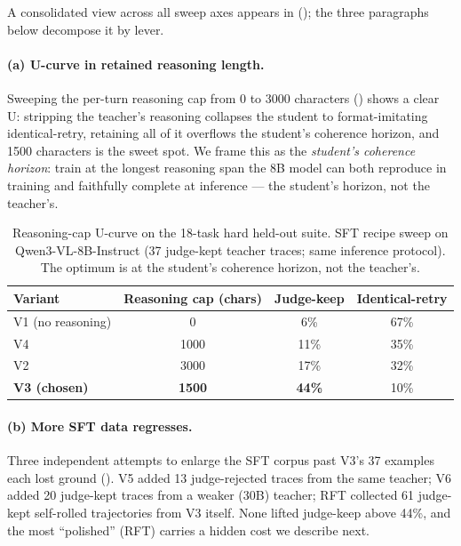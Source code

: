 \documentclass[11pt]{article}
\begin{document}
A consolidated view across all sweep axes appears in  (); the three paragraphs below decompose it by lever.

\paragraph{(a) U-curve in retained reasoning length.} Sweeping the per-turn reasoning cap from 0 to 3000 characters () shows a clear U: stripping the teacher's reasoning collapses the student to format-imitating identical-retry, retaining all of it overflows the student's coherence horizon, and 1500 characters is the sweet spot. We frame this as the \emph{student's coherence horizon}: train at the longest reasoning span the 8B model can both reproduce in training and faithfully complete at inference --- the student's horizon, not the teacher's.

\begin{table}[ht]
\centering
\caption{Reasoning-cap U-curve on the 18-task hard held-out suite. SFT recipe sweep on Qwen3-VL-8B-Instruct (37 judge-kept teacher traces; same inference protocol). The optimum is at the student's coherence horizon, not the teacher's.}
\label{tab:distill-ucurve}
\begin{tabular}{lccc}
\toprule
Variant & Reasoning cap (chars) & Judge-keep & Identical-retry \\
\midrule
V1 (no reasoning)     & 0    & 6\%  & 67\% \\
V4                    & 1000 & 11\% & 35\% \\
V2                    & 3000 & 17\% & 32\% \\
\textbf{V3 (chosen)}  & \textbf{1500} & \textbf{44\%} & 10\% \\
\bottomrule
\end{tabular}
\end{table}

\paragraph{(b) More SFT data regresses.} Three independent attempts to enlarge the SFT corpus past V3's 37 examples each lost ground (). V5 added 13 judge-rejected traces from the same teacher; V6 added 20 judge-kept traces from a weaker (30B) teacher; RFT collected 61 judge-kept self-rolled trajectories from V3 itself. None lifted judge-keep above 44\%, and the most ``polished'' (RFT) carries a hidden cost we describe next.
\end{document}

